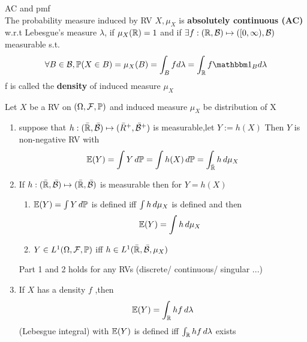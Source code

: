 \newpage 
\begin{dfn}AC and pmf \\
    The probability measure induced by RV $X, \mu_X$ is \textbf{absolutely continuous (AC)} w.r.t Lebesgue's measure $\lambda$, if $\mu_X(\mathbb{R}) = 1$ and if $\exists f:(\mathbb{R}, \mathcal{B}) \mapsto ([0,\infty), \mathcal{B})$ measurable s.t. 
    \begin{equation*}
        \forall B \in \B, \prob(X\in B) = \mu_X(B) = \int_B fd\lambda = \int_\R f \I_B d\lambda
    \end{equation*}f is called the \textbf{density} of induced measure $\mu_X$
\end{dfn}
\begin{thm} Let $X$ be a RV on $(\Omega, \mathcal{F}, \mathbb{P})$ and induced measure $\mu_X$ be distribution of X
\begin{enumerate}
    \item suppose that $h: (\bar{\mathbb{R}}, \bar{\mathcal{B}})\mapsto (\bar{R}^+, \bar{\mathcal{B}}^+)$ is measurable,let $Y:=h(X)$ Then $Y$ is non-negative RV with
    \begin{equation*}
        \mathbb{E}(Y) = \int Y\mathop{}\!d\mathbb{P} = \int h(X) \mathop{}\!d\mathbb{P}  = \int_{\bar{\mathbb{R}}} h \mathop{}\!d\mu_X
    \end{equation*}
    \item If $h: (\bar{\mathbb{R}}, \bar{\mathcal{B}})\mapsto (\bar{\mathbb{R}}, \bar{\mathcal{B}})$ is measurable then for $Y = h(X)$
        \begin{enumerate}
            \item $\mathbb{E}(Y) = \int Y\mathop{}\!d \mathbb{P}$ is defined iff $\int h \mathop{}\!d\mu_X$ is defined and then
            \begin{equation*}
                \mathbb{E}(Y) = \int h \mathop{}\!d \mu_X
            \end{equation*}
            \item $Y\in L^{1}(\Omega,\mathcal{F}, \mathbb{P})$ iff $h\in L^{1}(\bar{\mathbb{R}}, \bar{\mathcal{B}}, \mu_X)$
        \end{enumerate}
    \begin{rem}
    Part 1 and 2 holds for any RVs (discrete/ continuous/ singular ...)
    \end{rem}
    \item If $X$ has a density $f$ ,then 
    \begin{equation*}
        \mathbb{E}(Y) = \int_{\mathbb{R}} hf \mathop{}\!d\lambda
    \end{equation*}(Lebesgue integral) with $\mathbb{E}(Y)$ is defined iff $\int_{\mathbb{R}} hf \mathop{}\!d\lambda$ exists


\end{enumerate}
\end{thm}
